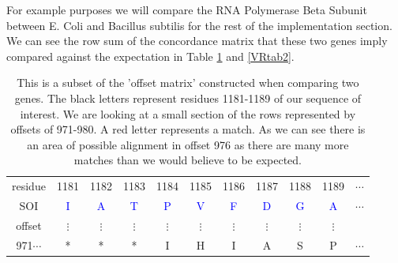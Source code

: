 \documentclass[phd,tocprelim]{cornell}
\begin{document}
For example purposes we will compare the RNA Polymerase Beta Subunit between E. Coli and Bacillus subtilis \cite{GenBank} for the rest of the implementation section. We can see the row sum of the concordance matrix that these two genes imply compared against the expectation in Table \ref{VRtab1} and \ref{VRtab2}.

\begin{table}[htp]
    \caption[Velvetrope offset matrix]{This is a subset of the 'offset matrix' constructed when comparing two genes. The black letters represent residues 1181-1189 of our sequence of interest. We are looking at a small section of the rows represented by offsets of 971-980. A red letter represents a match. As we can see there is an area of possible alignment in offset 976 as there are many more matches than we would believe to be expected.}
    \label{VRtab1}
\begin{center}
{\small
\begin{tabular}{|ccccccccccc|}                                                                                                     
\hline                                                                                                                                      
\scriptsize{residue} & \small{1181} &  \small{1182} &  \small{1183} &  \small{1184} &  \small{1185} &  \small{1186} &  \small{1187} &  \small{1188} &  \small{1189} & \small{}$\cdots$ \\                                                                                             
SOI & \textcolor{blue}{I} &  \textcolor{blue}{A} &  \textcolor{blue}{T} &  \textcolor{blue}{P} &  \textcolor{blue}{V} &  \textcolor{blue}{F} &  \textcolor{blue}{D} &  \textcolor{blue}{G} &  \textcolor{blue}{A} & $\cdots$ \\                                                                                                                                                                                
\hline                                                                                                                                                                                                      
\scriptsize{offset} & $\vdots$ &  $\vdots$ &  $\vdots$ & $\vdots$ &  $\vdots$ &  $\vdots$ & $\vdots$ &  $\vdots$ &  $\vdots$ & \\                                                                                                                                                                          
\small{971}$\cdots$ & * & * & * & I & H & I & A & S & P & $\cdots$ \\                                                                                  

\end{tabular}}
\end{center}
\end{table}
\end{document}
